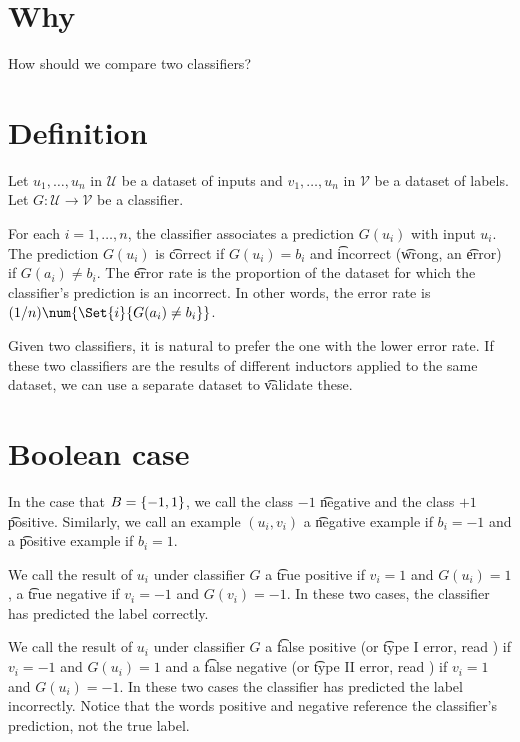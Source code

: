 
\section*{Why}

How should we compare two classifiers?

\section*{Definition}

Let $u_1, \dots , u_n$ in $\mathcal{U} $ be a dataset of inputs and $v_1, \dots , u_n$ in $\mathcal{V} $ be a dataset of labels.
Let $G: \mathcal{U}  \to \mathcal{V} $ be a classifier.

For each $i = 1, \dots , n$, the classifier associates a prediction $G(u_i)$ with input $u_i$.
The prediction $G(u_i)$ is \t{correct} if $G(u_i) = b_i$ and \t{incorrect} (\t{wrong}, an \t{error}) if $G(a_i) \neq b_i$.
The \t{error rate} is the proportion of the dataset for which the classifier's prediction is an incorrect.
In other words, the error rate is $(1/n)\num{\Set{i}{G(a_i) \neq b_i}}$.

Given two classifiers, it is natural to prefer the one with the lower error rate.
If these two classifiers are the results of different inductors applied to the same dataset, we can use a separate dataset to \t{validate} these.

\section*{Boolean case}

In the case that $B = \{-1, 1\}$, we call the class $-1$ \t{negative} and the class $+1$ \t{positive}.
Similarly, we call an example $(u_i, v_i)$ a \t{negative example} if $b_i = -1$ and a \t{positive example} if $b_i = 1$.

We call the result of $u_i$ under classifier $G$ a \t{true positive} if $v_i = 1$ and $G(u_i) = 1$, a \t{true negative} if $v_i = -1$ and $G(v_i) = -1$.
In these two cases, the classifier has predicted the label correctly.

We call the result of $u_i$ under classifier $G$ a \t{false positive} (or \t{type I error}, read ) if $v_i = -1$ and $G(u_i) = 1$ and a \t{false negative} (or \t{type II error}, read ) if $v_i = 1$ and $G(u_i) = -1$.
In these two cases the classifier has predicted the label incorrectly.
Notice that the words positive and negative reference the classifier's prediction, not the true label.


